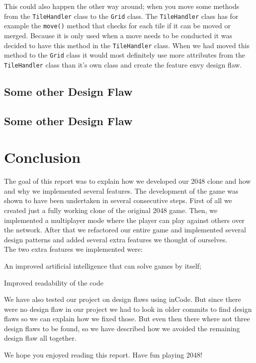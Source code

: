 \documentclass[a4paper,11pt,report]{scrartcl}
\begin{document}
This could also happen the other way around; when you move some methods from the \texttt{TileHandler} class to the \texttt{Grid} class. The \texttt{TileHandler} class has for example the \texttt{move()} method that checks for each tile if it can be moved or merged. Because it is only used when a move needs to be conducted it was decided to have this method in the \texttt{TileHandler} class. 
When we had moved this method to the \texttt{Grid} class it would most definitely use more attributes from the \texttt{TileHandler} class than it’s own class and create the feature envy design flaw.

\newpage\subsection{Some other Design Flaw}

\newpage\subsection{Some other Design Flaw}


\newpage\section{Conclusion}

The goal of this report was to explain how we developed our 2048 clone and how
and why we implemented several features. 
The development of the game was shown to have been undertaken in several consecutive steps. First of all we created just a fully working clone of the original 2048 game. Then, we implemented a multiplayer mode where the player can play against others over the network. After that we refactored our entire game and implemented several design patterns and added several extra features we thought of ourselves. \\

The two extra features we implemented were:
\begin{description}
	\item An improved artificial intelligence that can solve games by itself;
	\item Improved readability of the code
\end{description}

We have also tested our project on design flaws using inCode. But since there were no design flaw in our project we had to look in older commits to find design flaws so we can explain how we fixed those. But even then there where not three design flaws to be found, so we have described how we avoided the remaining design flaw all together.

We hope you enjoyed reading this report. Have fun playing 2048!
\end{document}
